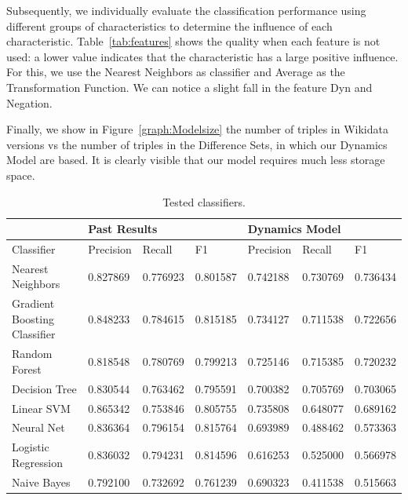 \documentclass[runningheads]{llncs}
\begin{document}
Subsequently, we individually evaluate the classification performance using different groups of characteristics to determine the influence of each characteristic. Table~\ref{tab:features} shows the quality when each feature is not used: a lower value indicates that the characteristic has a large positive influence. For this, we use the Nearest Neighbors as classifier and Average as the Transformation Function. We can notice a slight fall in the feature Dyn and Negation.

Finally, we show in Figure~\ref{graph:Modelsize} the number of triples in Wikidata versions vs the number of triples in the Difference Sets, in which our Dynamics Model are based. It is clearly visible that our model requires much less storage space.

\begin{table}[h]
	\centering
	\caption{Tested classifiers.}
	\label{tab:classifier}
	\begin{tabular}{|l|lll|lll|}    \hline
		& \multicolumn{3}{|l|}{Past Results}           & \multicolumn{3}{|l|}{Dynamics Model}        \\    \hline
		Classifier                   & Precision & Recall & F1 & Precision & Recall & F1 \\    \hline
		Nearest Neighbors            & 0.827869 & 0.776923 & 0.801587 & 0.742188 & 0.730769 & 0.736434 \\
		Gradient Boosting Classifier & 0.848233 & 0.784615 & 0.815185 & 0.734127 & 0.711538 & 0.722656 \\
		Random Forest                & 0.818548 & 0.780769 & 0.799213 & 0.725146 & 0.715385 & 0.720232 \\
		Decision Tree                & 0.830544 & 0.763462 & 0.795591 & 0.700382 & 0.705769 & 0.703065 \\
		Linear SVM                   & 0.865342 & 0.753846 & 0.805755 & 0.735808 & 0.648077 & 0.689162 \\
		Neural Net                   & 0.836364 & 0.796154 & 0.815764 & 0.693989 & 0.488462 & 0.573363 \\
		Logistic Regression          & 0.836032 & 0.794231 & 0.814596 & 0.616253 & 0.525000    & 0.566978 \\
		Naive Bayes                  & 0.792100   & 0.732692 & 0.761239 & 0.690323 & 0.411538 & 0.515663 \\    \hline
	\end{tabular}
\end{table}
\end{document}
